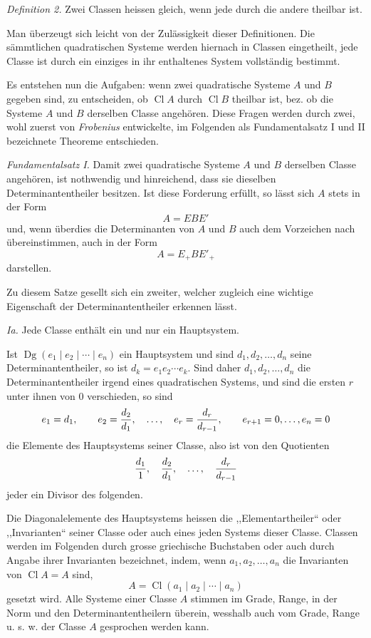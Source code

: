 \documentclass[11pt,a4paper]{article}
\newcommand{\Cl}{\operatorname{Cl}}
\newcommand{\Dg}{\operatorname{Dg}}
\begin{document}
\emph{Definition 2.} Zwei Classen heissen gleich, wenn jede durch die andere theilbar ist.

Man überzeugt sich leicht von der Zulässigkeit dieser Definitionen. Die sämmtlichen quadratischen Systeme werden hiernach in Classen eingetheilt, jede Classe ist durch ein einziges in ihr enthaltenes System vollständig bestimmt.

Es entstehen nun die Aufgaben: wenn zwei quadratische Systeme $A$ und $B$ gegeben sind, zu entscheiden, ob $\Cl A$ durch $\Cl B$ theilbar ist, bez. ob die Systeme $A$ und $B$ derselben Classe angehören. Diese Fragen werden durch zwei, wohl zuerst von \emph{Frobenius} entwickelte, im Folgenden als Fundamentalsatz I und II bezeichnete Theoreme entschieden.

\emph{Fundamentalsatz I.} Damit zwei quadratische Systeme $A$ und $B$ derselben Classe angehören, ist nothwendig und hinreichend, dass sie dieselben Determinantentheiler besitzen. Ist diese Forderung erfüllt, so lässt sich $A$ stets in der Form
\[
 A=EBE'
\]
und, wenn überdies die Determinanten von $A$ und $B$ auch dem Vorzeichen nach übereinstimmen, auch in der Form
\[
 A=E_+BE'_+
\]
darstellen.

Zu diesem Satze gesellt sich ein zweiter, welcher zugleich eine wichtige Eigenschaft der Determinantentheiler erkennen lässt.

\emph{Ia.} Jede Classe enthält ein und nur ein Hauptsystem.

Ist $\Dg(e_1\mid e_2\mid\cdots\mid e_n)$ ein Hauptsystem und sind $d_1,d_2,\ldots,d_n$ seine Determinantentheiler, so ist $d_k=e_1e_2\cdots e_k$. Sind daher $d_1,d_2,\ldots,d_n$ die Determinantentheiler irgend eines quadratischen Systems, und sind die ersten $r$ unter ihnen von 0 verschieden, so sind
\[
 e_1=d_1,\qquad e_2={d_2\over d_1},\quad \ldots,\quad e_r={d_r\over d_{r-1}},\qquad e_{r+1}=0,\ldots,e_n=0
\]
die Elemente des Hauptsystems seiner Classe, also ist von den Quotienten
\[
 {d_1\over 1},\quad {d_2\over d_1},\quad \ldots,\quad {d_r\over d_{r-1}}
\]
jeder ein Divisor des folgenden.

Die Diagonalelemente des Hauptsystems heissen die ,,Elementartheiler`` oder ,,Invarianten`` seiner Classe oder auch eines jeden Systems dieser Classe. Classen werden im Folgenden durch grosse griechische Buchstaben oder auch durch Angabe ihrer Invarianten bezeichnet, indem, wenn $a_1,a_2,\ldots,a_n$ die Invarianten von $\Cl A=A$ sind,
\[
 A=\Cl(a_1\mid a_2\mid\cdots\mid a_n)
\]
gesetzt wird. Alle Systeme einer Classe $A$ stimmen im Grade, Range, in der Norm und den Determinantentheilern überein, wesshalb auch vom Grade, Range u. s. w. der Classe $A$ gesprochen werden kann.
\end{document}
